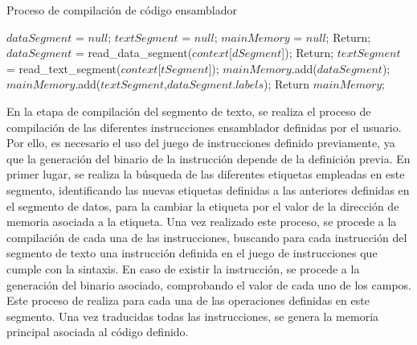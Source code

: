 \begin{algorithm}[h]
	\caption{Proceso de compilación de código ensamblador}
	\label{alg:assembly_compiler_pseudocode}
  	\scriptsize
	\begin{algorithmic}[1]
		\State $dataSegment$ = $null$;
		\State $textSegment$ = $null$;
		\State $mainMemory$ = $null$;
			\State Return;
		\EndIf
		\State $dataSegment$ = read\_data\_segment($context$[$dSegment$]);
			\State Return;
		\EndIf
		\State $textSegment$ = read\_text\_segment($context$[$tSegment$]);
		\State $mainMemory$.add($dataSegment$);
		\State $mainMemory$.add($textSegment$,$dataSegment$.$labels$);
		\State Return $mainMemory$;
		\EndFunction
\end{algorithmic}
\end{algorithm}

En la etapa de compilación del segmento de texto, se realiza el proceso de compilación de las diferentes instrucciones ensamblador definidas por el usuario. Por ello, es necesario el uso del juego de instrucciones definido previamente, ya que la generación del binario de la instrucción depende de la definición previa. En primer lugar, se realiza la búsqueda de las diferentes etiquetas empleadas en este segmento, identificando las nuevas etiquetas definidas a las anteriores definidas en el segmento de datos, para la cambiar la etiqueta por el valor de la dirección de memoria asociada a la etiqueta. Una vez realizado este proceso, se procede a la compilación de cada una de las instrucciones, buscando para cada instrucción del segmento de texto una instrucción definida en el juego de instrucciones que cumple con la sintaxis. En caso de existir la instrucción, se procede a la generación del binario asociado, comprobando el valor de cada uno de los campos. Este proceso de realiza para cada una de las operaciones definidas en este segmento. Una vez traducidas todas las instrucciones, se genera la memoria principal asociada al código definido.

